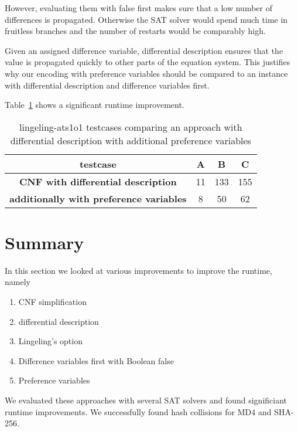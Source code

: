 However, evaluating them with false first makes sure that a low
number of differences is propagated. Otherwise the SAT solver would
spend much time in fruitless branches and the number of restarts
would be comparably high.

Given an assigned difference variable, differential description
ensures that the value is propagated quickly to other parts of
the equation system. This justifies why our encoding with preference
variables should be compared to an instance with differential
description and difference variables first.

Table~\ref{tab:pref-vars-results} shows a significant runtime improvement.

\begin{table}[!h]
  \begin{center}
    \begin{tabular}{c|ccc}
      \textbf{testcase}                                & \textbf{A} &  \textbf{B} &  \textbf{C} \\
    \hline
      \textbf{CNF with differential description}       &         11 &         133 &       155 \\
      \textbf{additionally with preference variables}  &          8 &          50 &        62 \\
    \end{tabular}
    \caption{
      lingeling-ats1o1 testcases comparing an approach
      with differential description with additional preference variables
    }
    \label{tab:pref-vars-results}
  \end{center}
\end{table}

\section{Summary}
\label{sec:results-summary}
%
In this section we looked at various improvements to improve the runtime, namely
\begin{enumerate}
  \item CNF simplification
  \item differential description
  \item Lingeling's \mone{} option
  \item Difference variables first with Boolean false
  \item Preference variables
\end{enumerate}
%
We evaluated these approaches with several SAT solvers and found significiant
runtime improvements. We successfully found hash collisions for MD4 and SHA-256.
